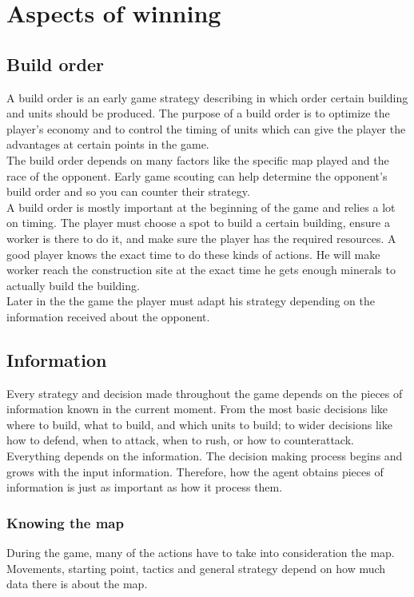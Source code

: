 \section{Aspects of winning}
	\subsection{Build order}
		A build order is an early game strategy describing in which order certain building and units should be produced\cite{wiki_build_order}. 
		The purpose of a build order is to optimize the player's economy and to control the timing of units which can give 
		the player the advantages at certain points in the game.\\
		The build order depends on many factors like the specific map played and the race of the opponent. 
		Early game scouting can help determine the opponent's build order and so you can counter their strategy.\\
		
		A build order is mostly important at the beginning of the game and relies a lot on timing. 
		The player must choose a spot to build a certain building, ensure a worker is there to do it, 
		and make sure the player has the required resources. 
		A good player knows the exact time to do these kinds of actions. 
		He will make worker reach the construction site at the exact time he gets enough minerals to actually build the building.\\
		
		Later in the the game the player must adapt his strategy depending on the information received about the opponent.
	
	\subsection{Information}

		Every strategy and decision made throughout the game depends on the pieces of information 
		known in the current moment. From the most basic decisions like where to build, what to build, and
		which units to build; to wider decisions like how to defend, when to attack, when to rush, or how to counterattack.
		Everything depends on the information. The decision making process begins and grows with the input information.
		Therefore, how the agent obtains pieces of information is just as important 
		as how it process them. 
	
			\subsubsection{Knowing the map}
				During the game, many of the actions have to take into consideration the map. Movements, starting point, 
				tactics and general strategy depend on how much data there is about the map.  
				
